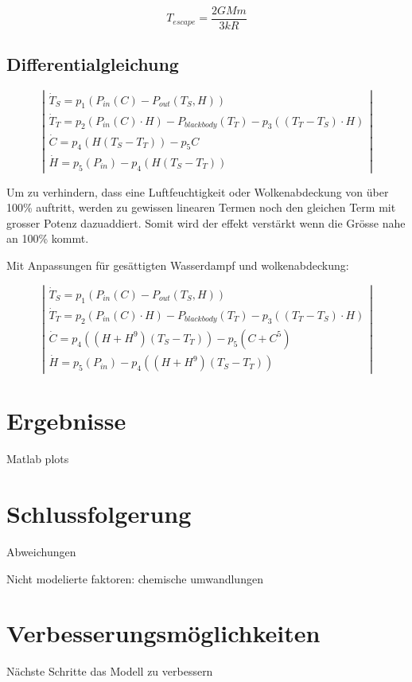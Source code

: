 \begin{refsection}
\begin{equation}
T_{escape} = \frac{2GMm}{3kR}
\end{equation}



\subsection{Differentialgleichung}

\begin{equation}
\left|
\begin{array}{lcl}
\dot{T}_S = p_1 \left( P_{in}(C) - P_{out}(T_S, H) \right) \\
\dot{T}_T = p_2 \left( P_{in}(C) \cdot H \right) - P_{blackbody}(T_T) - p_3 \left( (T_T - T_S) \cdot H \right) \\
\dot{C} = p_4 \left( H(T_S - T_T) \right) - p_5 C \\
\dot{H} = p_5 \left(P_{in} \right) - p_4 \left( H(T_S - T_T) \right)
\end{array}
\right|
\end{equation}

Um zu verhindern, dass eine Luftfeuchtigkeit oder Wolkenabdeckung von über 100\% auftritt, werden zu gewissen linearen Termen noch den gleichen Term mit grosser Potenz dazuaddiert. Somit wird der effekt verstärkt wenn die Grösse nahe an 100\% kommt.  

Mit Anpassungen für gesättigten Wasserdampf und wolkenabdeckung:

\begin{equation}
\left|
\begin{array}{lcl}
\dot{T}_S = p_1 \left( P_{in}(C) - P_{out}(T_S, H) \right) \\
\dot{T}_T = p_2 \left( P_{in}(C) \cdot H \right) - P_{blackbody}(T_T) - p_3 \left( (T_T - T_S) \cdot H \right) \\
\dot{C} = p_4 \left( (H + H^9)(T_S - T_T) \right) - p_5 (C + C^5) \\
\dot{H} = p_5 \left(P_{in} \right) - p_4 \left( (H + H^9 )(T_S - T_T) \right)
\end{array}
\right|
\end{equation}

\section{Ergebnisse}

Matlab plots



\section{Schlussfolgerung}

Abweichungen

Nicht modelierte faktoren:
chemische umwandlungen

\section{Verbesserungsmöglichkeiten}

Nächste Schritte das Modell zu verbessern


\printbibliography[heading=subbibliography]
\end{refsection}
